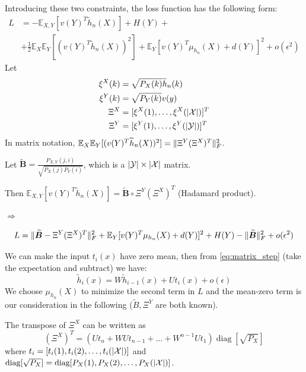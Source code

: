 \documentclass{article}
\DeclarePairedDelimiter\abs{\lvert}{\rvert}
\DeclarePairedDelimiter\norm{\lVert}{\rVert}
\def\E{\mathbb{E}}
\DeclareMathOperator\diag{diag}
\begin{document}
Introducing these two constraints, the loss function has the following form:
\begin{align*}
L &= -\E_{X,Y}[v(Y)^T\widetilde{h}_n(X)] + H(Y) +\\
&+\frac{1}{2}\E_X\E_Y[(v(Y)^T\widetilde{h}_n(X))^2] + \E_Y[v(Y)^T\mu_{h_n}(X)+d(Y)]^2 + o(\epsilon^2)
\end{align*}
Let 
\begin{subequations}
\begin{align}
\xi^X(k) & = \sqrt{P_X(k)}\widetilde{h}_n(k)  \\
\xi^Y(k) & = \sqrt{P_Y(k)}v(y)  \\
\Xi^X & = [\xi^X(1),\dots,\xi^X(\abs{\mathcal{X}})]^T \\ %
\Xi^Y & = [\xi^Y(1),\dots,\xi^Y(\abs{\mathcal{Y}})]^T    %
\end{align}
\end{subequations}
In matrix notation, $\E_X\E_Y[(v(Y)^T\widetilde{h}_n(X))^2]=\norm{\Xi^Y(\Xi^X)^T}^2_F$.

Let $\widetilde{\bm{B}}=\frac{P_{X,Y}(j,i)}{\sqrt{P_X(j)P_Y(i)}}$, which is a $\abs{\mathcal{Y}} \times \abs{\mathcal{X}}$ matrix.

Then $\E_{X,Y}[v(Y)^T\widetilde{h}_n(X)] = \widetilde{\bm{B}}\circ\Xi^Y(\Xi^X)^T $ (Hadamard product).

$\Rightarrow$

\begin{equation}
L = \norm{\widetilde{\bm{B}}-\Xi^Y(\Xi^X)^T}_F^2 + \E_Y[v(Y)^T\mu_{h_n}(X)+d(Y)]^2 + H(Y) -\norm{\widetilde{\bm{B}}}_F^2 + o(\epsilon^2)
\end{equation}

We can make the input $t_i(x)$ have zero mean, then from \eqref{eq:matrix_step} (take the expectation and subtract) we have:
$$
\widetilde{h}_i(x)=W \widetilde{h}_{i-1}(x) + U t_i(x) + o(\epsilon)
$$
We choose $\mu_{h_n}(X)$ to minimize the second term in $L$ and the mean-zero term is our consideration in the following ($\widetilde{B}, \Xi^{Y}$ are both known).

The transpose of $\Xi^{X}$ can be written as
$$
(\Xi^{X})^T = (Ut_n + WUt_{n-1} + \dots + W^{n-1} U t_1) \diag[\sqrt{P_X}]
$$
where $ t_i = [t_i(1), t_i(2), \dots, t_i( \abs{\mathcal{X}} ) ]$ and 
$
\diag [ \sqrt{P_X} ]  = \diag [ P_X(1), P_X(2), \dots, P_X(\abs{\mathcal{X}  })]
$.
\end{document}
